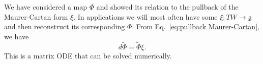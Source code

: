 We have considered a map $\Phi$ and showed its relation to the pullback of the Maurer-Cartan form $\xi$. In applications we will most often have some $\xi : TW \to \mathfrak{g}$ and then reconstruct its corresponding $\Phi$. From Eq.~\ref{eq:pullback Maurer-Cartan}, we have
\begin{equation}
d\tilde{\Phi} = \tilde{\Phi} \xi.
\end{equation}
This is a matrix ODE that can be solved numerically.


